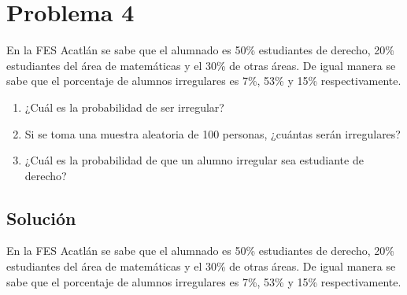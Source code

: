 \documentclass[titlepage]{article} %
\begin{document}
    \section*{\Large Problema 4}

\Large En la FES Acatlán se sabe que el alumnado es 50\% estudiantes de derecho, 20\% estudiantes del área de matemáticas y el 30\% de otras áreas. De igual manera se sabe que el porcentaje de alumnos irregulares es 7\%, 53\% y 15\% respectivamente.

\begin{enumerate}
    \item ¿Cuál es la probabilidad de ser irregular?
    \item Si se toma una muestra aleatoria de 100 personas, ¿cuántas serán irregulares?
    \item ¿Cuál es la probabilidad de que un alumno irregular sea estudiante de derecho?
\end{enumerate}

\subsection*{\Large Solución}

\Large
En la FES Acatlán se sabe que el alumnado es 50\% estudiantes de derecho, 20\% estudiantes del área de matemáticas y el 30\% de otras áreas. De igual manera se sabe que el porcentaje de alumnos irregulares es 7\%, 53\% y 15\% respectivamente.
\end{document}
